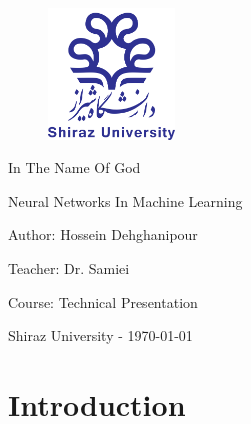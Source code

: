 \documentclass[12pt , a4paper]{article}
\title{\normalfont{Neural Networks}}
\author{Hossein Dehghanipour}
\date{\today}
\newcommand{\thedate}{\today}
\begin{document}
\thispagestyle{empty}
 \begin{center}
\begin{figure}[H]
\centering
\includegraphics[width=0.3\textwidth]{shirazuLogo.png}
\caption*{}
\label{f-0-0}
\end{figure}

{
\centering
{}  
\fontsize{16pt}{16pt}
\selectfont 
In The Name Of God
}

{
\centering
{}  
\fontsize{14pt}{14pt}
\selectfont 
Neural Networks In Machine Learning
}

{
\centering
{}  
\fontsize{12pt}{12pt}
\selectfont 
Author: Hossein Dehghanipour
}

{
\centering
{}  
\fontsize{12pt}{12pt}
\selectfont 
Teacher: Dr. Samiei
}

{
\centering
{}  
\fontsize{12pt}{12pt}
\selectfont 
Course: Technical Presentation 
}

{
\centering
{}  
\fontsize{12pt}{12pt}
\selectfont 
Shiraz University - \thedate
}

\end{center}
 

 
\setmainfont{Times New Roman}
\cleardoublepage
\tableofcontents
\thispagestyle{empty}
\cleardoublepage

\section { Introduction } 
\end{document}
